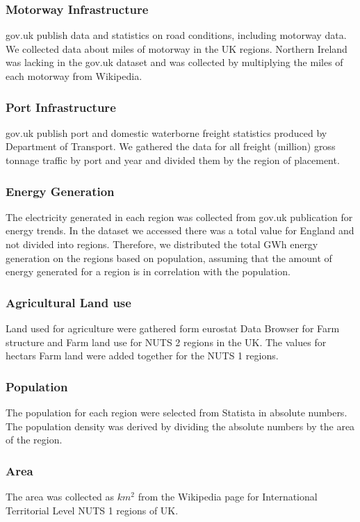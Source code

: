 \documentclass[10pt,a4paper]{article}
\begin{document}
\subsubsection{Motorway Infrastructure}
gov.uk publish data and statistics on road conditions, including motorway data. We collected data about miles of motorway in the UK regions. Northern Ireland was lacking in the gov.uk dataset and was collected by multiplying the miles of each motorway from Wikipedia.
\cite{road,noauthor_categorymotorways_2013}%
\subsubsection{Port Infrastructure}
gov.uk publish port and domestic waterborne freight statistics produced by Department of Transport. We gathered the data for all freight (million) gross tonnage traffic by port and year and divided them by the region of placement.
\cite{port}
\subsubsection{Energy Generation}
The electricity generated in each region was collected from gov.uk publication for energy trends. In the dataset we accessed there was a total value for England and not divided into regions. Therefore, we distributed the total GWh energy generation on the regions based on population, assuming that the amount of energy generated for a region is in correlation with the population. 
\cite{energy}
\subsubsection{Agricultural Land use}
Land used for agriculture were gathered form eurostat Data Browser for Farm structure and Farm land use for NUTS 2 regions in the UK. The values for hectars Farm land were added together for the NUTS 1 regions.
\cite{statistics}
\subsubsection{Population}
The population for each region were selected from Statista in absolute numbers. The population density was derived by dividing the absolute numbers by the area of the region. \cite{noauthor_uk_nodate,regional,uk,noauthor_international_2022}
\subsubsection{Area}
The area was collected as $km^2$ from the Wikipedia page for International Territorial Level NUTS 1 regions of UK.
\cite{noauthor_international_2022,regional,uk}
\end{document}
